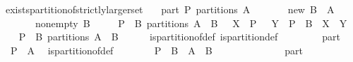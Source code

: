 \begin{isabellebody}
\isamarkuptrue%
\isamarkupfalse%
\ exists{\isacharunderscore}partition{\isacharunderscore}of{\isacharunderscore}strictly{\isacharunderscore}larger{\isacharunderscore}set{\isacharcolon}\isanewline
\ \ \ part{\isacharcolon}\ {\isachardoublequoteopen}P\ partitions\ A{\isachardoublequoteclose}\isanewline
\ \ \ \ \ \ \ new{\isacharcolon}\ {\isachardoublequoteopen}B\ {\isasyminter}\ A\ {\isacharequal}\ {\isacharbraceleft}{\isacharbraceright}{\isachardoublequoteclose}\isanewline
\ \ \ \ \ \ \ non{\isacharunderscore}empty{\isacharcolon}\ {\isachardoublequoteopen}B\ {\isasymnoteq}\ {\isacharbraceleft}{\isacharbraceright}{\isachardoublequoteclose}\isanewline
\ \ \ {\isachardoublequoteopen}{\isacharparenleft}P\ {\isasymunion}\ {\isacharbraceleft}B{\isacharbraceright}{\isacharparenright}\ partitions\ {\isacharparenleft}A\ {\isasymunion}\ B{\isacharparenright}\ {\isasymand}\ {\isacharparenleft}{\isasymforall}\ X\ {\isasymin}\ P\ {\isachardot}\ {\isasymexists}\ Y\ {\isasymin}\ P\ {\isasymunion}\ {\isacharbraceleft}B{\isacharbraceright}\ {\isachardot}\ X\ {\isasymsubseteq}\ Y{\isacharparenright}{\isachardoublequoteclose}\isanewline
%
\isadelimproof
%
\endisadelimproof
%
\isatagproof
{}\isamarkupfalse%
\isanewline
\ \ \isamarkupfalse%
\ {\isachardoublequoteopen}{\isacharparenleft}P\ {\isasymunion}\ {\isacharbraceleft}B{\isacharbraceright}{\isacharparenright}\ partitions\ {\isacharparenleft}A\ {\isasymunion}\ B{\isacharparenright}{\isachardoublequoteclose}\isanewline
\ \ \ \ \isamarkupfalse%
\ is{\isacharunderscore}partition{\isacharunderscore}of{\isacharunderscore}def\ is{\isacharunderscore}partition{\isacharunderscore}def\isanewline
\ \ \isamarkupfalse%
\isanewline
\ \ \ \ \isamarkupfalse%
\ part\ \isamarkupfalse%
\ {\isachardoublequoteopen}{\isasymUnion}\ P\ {\isacharequal}\ A{\isachardoublequoteclose}\ \isamarkupfalse%
\ is{\isacharunderscore}partition{\isacharunderscore}of{\isacharunderscore}def\ \isacommand{{\isachardot}{\isachardot}}\isamarkupfalse%
\isanewline
\isanewline
\ \ \ \ \isamarkupfalse%
\ {\isachardoublequoteopen}{\isasymUnion}\ {\isacharparenleft}P\ {\isasymunion}\ {\isacharbraceleft}B{\isacharbraceright}{\isacharparenright}\ {\isacharequal}\ A\ {\isasymunion}\ B{\isachardoublequoteclose}\isanewline
\ \ \ \ \isamarkupfalse%
\ {\isacharminus}\isanewline
\ \ \ \ \ \ \isamarkupfalse%
\ part\ \isamarkupfalse%

\end{isabellebody}
